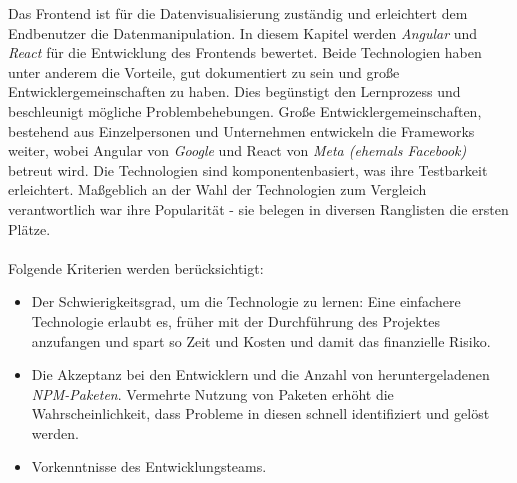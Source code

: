 Das Frontend ist für die Datenvisualisierung zuständig und erleichtert dem Endbenutzer die Datenmanipulation. In diesem Kapitel werden \textit{Angular} und \textit{React} für die Entwicklung des Frontends bewertet. Beide Technologien haben unter anderem die Vorteile, gut dokumentiert zu sein und große Entwicklergemeinschaften zu haben\cite{SO01}. Dies begünstigt den Lernprozess und beschleunigt mögliche Problembehebungen. Große Entwicklergemeinschaften, bestehend aus Einzelpersonen und Unternehmen entwickeln die Frameworks weiter, wobei Angular von \textit{Google} und React von \textit{Meta (ehemals Facebook)} betreut wird. Die Technologien sind komponentenbasiert, was ihre Testbarkeit erleichtert. Maßgeblich an der Wahl der Technologien zum Vergleich verantwortlich war ihre Popularität - sie belegen in diversen Ranglisten die ersten Plätze\cite{SO01}.
\\\\
Folgende Kriterien werden berücksichtigt:
\begin{itemize}
  \item
         Der Schwierigkeitsgrad, um die Technologie zu lernen: Eine einfachere Technologie erlaubt es, früher mit der Durchführung des Projektes anzufangen und spart so Zeit und Kosten und damit das finanzielle Risiko.
  \item
        Die Akzeptanz bei den Entwicklern und die Anzahl von heruntergeladenen \textit{NPM-Paketen}. Vermehrte Nutzung von Paketen erhöht die Wahrscheinlichkeit, dass Probleme in diesen schnell identifiziert und gelöst werden\cite{LIN1}.
  \item
        Vorkenntnisse des Entwicklungsteams.

\end{itemize}

